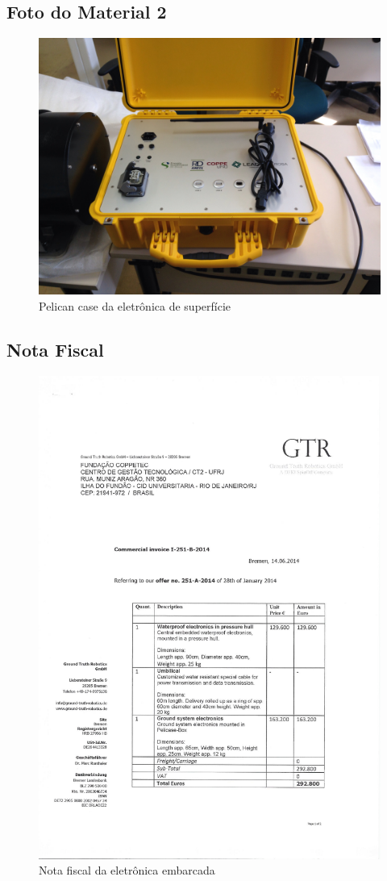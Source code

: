 \subsection{Foto do Material 2}
\begin{figure}[H]
 \centering
 \includegraphics[width=1\columnwidth]{EEA/foto2.jpg}
 \caption{Pelican case da eletrônica de superfície}
\end{figure}

\subsection{Nota Fiscal}
\begin{figure}[H]
 \centering
 \includegraphics[width=0.9\columnwidth]{EEA/nota_gtr.pdf}
 \caption{Nota fiscal da eletrônica embarcada}
\end{figure}



